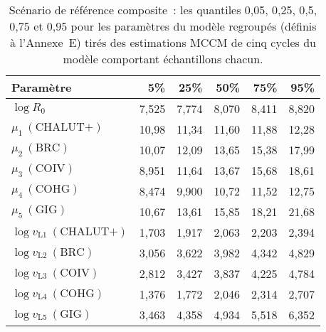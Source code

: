 \documentclass[11pt]{book}
\newcommand{\AppEqn}{Annexe~E}
\begin{document}
\setlength{\tabcolsep}{6pt}
\begin{table}[ht]
\centering
\caption{Sc\'{e}nario de r\'{e}f\'{e}rence composite~: les quantiles 0,05, 0,25, 0,5, 0,75 et 0,95 pour les param\`{e}tres du mod\`{e}le regroup\'{e}s (d\'{e}finis \`{a} l'\AppEqn) tir\'{e}s des estimations MCCM de cinq cycles du mod\`{e}le comportant \Nmcmc{} \'{e}chantillons chacun.} 
\label{tab:ymr.base.pars}
\begin{tabular}{lrrrrr}
  \\[-1.0ex] \hline
Param\`{e}tre & 5\% & 25\% & 50\% & 75\% & 95\% \\ 
  \hline
$\log R_{0}$ & 7,525 & 7,774 & 8,070 & 8,411 & 8,820 \\ 
  $\mu_{1}~(\text{CHALUT+})$ & 10,98 & 11,34 & 11,60 & 11,88 & 12,28 \\ 
  $\mu_{2}~(\text{BRC})$ & 10,07 & 12,09 & 13,65 & 15,38 & 17,99 \\ 
  $\mu_{3}~(\text{COIV})$ & 8,951 & 11,64 & 13,67 & 15,68 & 18,61 \\ 
  $\mu_{4}~(\text{COHG})$ & 8,474 & 9,900 & 10,72 & 11,52 & 12,75 \\ 
  $\mu_{5}~(\text{GIG})$ & 10,67 & 13,61 & 15,85 & 18,21 & 21,68 \\ 
  $\log v_{\text{L}1}~(\text{CHALUT+})$ & 1,703 & 1,917 & 2,063 & 2,203 & 2,394 \\ 
  $\log v_{\text{L}2}~(\text{BRC})$ & 3,056 & 3,622 & 3,982 & 4,342 & 4,829 \\ 
  $\log v_{\text{L}3}~(\text{COIV})$ & 2,812 & 3,427 & 3,837 & 4,225 & 4,784 \\ 
  $\log v_{\text{L}4}~(\text{COHG})$ & 1,376 & 1,772 & 2,046 & 2,314 & 2,707 \\ 
  $\log v_{\text{L}5}~(\text{GIG})$ & 3,463 & 4,358 & 4,934 & 5,518 & 6,352 \\ 
   \hline
\end{tabular}
\end{table}
\setlength{\tabcolsep}{6pt}
\end{document}
